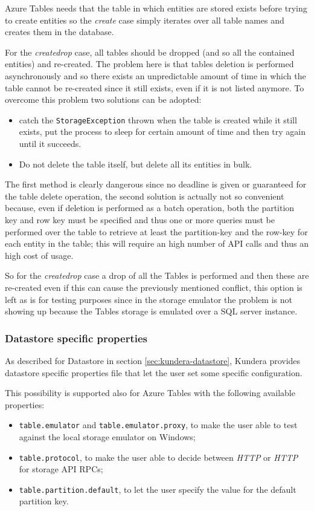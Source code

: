 \noindent Azure Tables needs that the table in which entities are stored exists before trying to create entities so the \textit{create} case simply iterates over all table names and creates them in the database. 

\noindent For the \textit{create\textunderscore drop} case, all tables should be dropped (and so all the contained entities) and re-created. The problem here is that tables deletion is performed asynchronously and so there exists an unpredictable amount of time in which the table cannot be re-created since it still exists, even if it is not listed anymore.
\noindent To overcome this problem two solutions can be adopted:
\begin{itemize}
\item catch the \texttt{StorageException} thrown when the table is created while it still exists, put the process to sleep for certain amount of time and then try again until it succeeds.
\item Do not delete the table itself, but delete all its entities in bulk.
\end{itemize}

\noindent The first method is clearly dangerous since no deadline is given or guaranteed for the table delete operation, the second solution is actually not so convenient because, even if deletion is performed as a batch operation, both the partition key and row key must be specified and thus one or more queries must be performed over the table to retrieve at least the partition-key and the row-key for each entity in the table; this will require an high number of API calls and thus an high cost of usage.

\noindent So for the \textit{create\textunderscore drop} case a drop of all the Tables is performed and then these are re-created even if this can cause the previously mentioned conflict, this option is left as is for testing purposes since in the storage emulator the problem is not showing up because the Tables storage is emulated over a SQL server instance.

\subsubsection{Datastore specific properties}
As described for Datastore in section \ref{sec:kundera-datastore}, Kundera provides datastore specific properties file that let the user set some specific configuration.

\noindent This possibility is supported also for Azure Tables with the following available properties:
\begin{itemize}
\item \texttt{table.emulator} and \texttt{table.emulator.proxy}, to make the user able to test against the local storage emulator on Windows;
\item \texttt{table.protocol}, to make the user able to decide between \textit{HTTP} or \textit{HTTP} for storage API RPCs;
\item \texttt{table.partition.default}, to let the user specify the value for the default partition key.
\end{itemize} 

